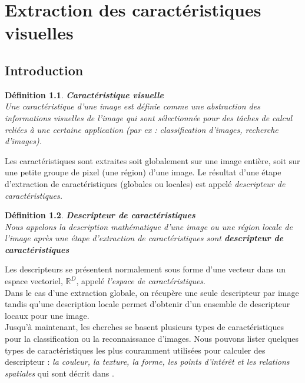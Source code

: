 \chapter[Extraction des caractéristiques]{Extraction des caractéristiques visuelles}
\label{chap:sift}

\section{Introduction}
\newtheorem{mydef}{Définition}
\begin{mydef}
\textbf{Caractéristique visuelle} \\
Une caractéristique d'une image est définie comme une abstraction des informations visuelles de l'image qui sont sélectionnée pour des tâches de calcul reliées à une certaine application (par ex : classification d'images, recherche d'images).
\end{mydef}

Les caractéristiques sont extraites soit globalement sur une image entière, soit sur une petite groupe de pixel (une région) d'une image. Le résultat d'une étape d'extraction de caractéristiques (globales ou locales) est appelé \textit{descripteur de caractéristiques.}

\begin{mydef}
\textbf{Descripteur de caractéristiques} \\
Nous appelons la description mathématique d'une image ou une région locale de l'image après une étape d'extraction de caractéristiques sont \textbf{descripteur de caractéristiques}
\end{mydef}

Les descripteurs se présentent normalement sous forme d'une vecteur dans un espace vectoriel, $\mathbb{R}^D$, appelé \textit{l'espace de caractéristiques}. \\

Dans le cas d'une extraction globale, on récupère une seule descripteur par image tandis qu'une description locale permet d'obtenir d'un ensemble de descripteur locaux pour une image. \\

Jusqu'à maintenant, les cherches se basent plusieurs types de caractéristiques pour la classification ou la reconnaissance d'images. Nous pouvons lister quelques types de caractéristiques les plus couramment utilisées pour calculer des descripteur : \textit{la couleur, la texture, la forme, les points d'intérêt et les relations spatiales} qui sont décrit dans \cite{khang09}.\\

